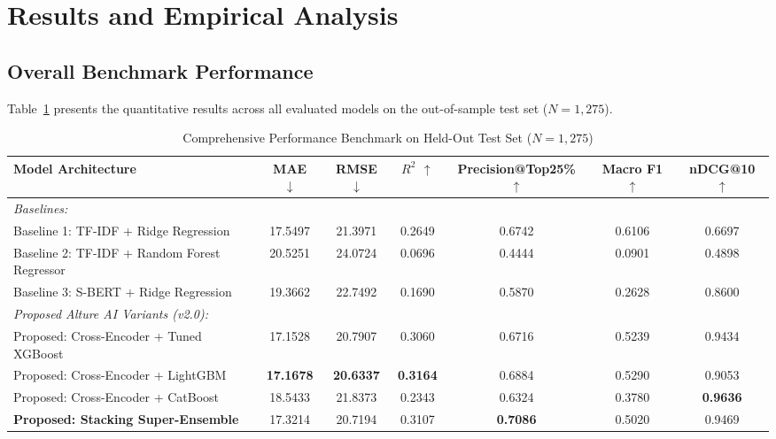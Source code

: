 \documentclass[conference]{IEEEtran}
\begin{document}
\section{Results and Empirical Analysis}

\subsection{Overall Benchmark Performance}
Table~\ref{tab:main_results} presents the quantitative results across all evaluated models on the out-of-sample test set ($N=1,275$).

\begin{table}[htbp]
\centering
\caption{Comprehensive Performance Benchmark on Held-Out Test Set ($N = 1,275$)}
\label{tab:main_results}
\begin{tabular}{lcccccc}
\toprule
\textbf{Model Architecture} & \textbf{MAE} $\downarrow$ & \textbf{RMSE} $\downarrow$ & \textbf{$R^2$} $\uparrow$ & \textbf{Precision@Top25\%} $\uparrow$ & \textbf{Macro F1} $\uparrow$ & \textbf{nDCG@10} $\uparrow$ \\
\midrule
\textit{Baselines:} & & & & & & \\
Baseline 1: TF-IDF + Ridge Regression          & 17.5497 & 21.3971 & 0.2649 & 0.6742 & 0.6106 & 0.6697 \\
Baseline 2: TF-IDF + Random Forest Regressor   & 20.5251 & 24.0724 & 0.0696 & 0.4444 & 0.0901 & 0.4898 \\
Baseline 3: S-BERT + Ridge Regression          & 19.3662 & 22.7492 & 0.1690 & 0.5870 & 0.2628 & 0.8600 \\
\midrule
\textit{Proposed Alture AI Variants (v2.0):} & & & & & & \\
Proposed: Cross-Encoder + Tuned XGBoost        & 17.1528 & 20.7907 & 0.3060 & 0.6716 & 0.5239 & 0.9434 \\
Proposed: Cross-Encoder + LightGBM             & \textbf{17.1678} & \textbf{20.6337} & \textbf{0.3164} & 0.6884 & 0.5290 & 0.9053 \\
Proposed: Cross-Encoder + CatBoost             & 18.5433 & 21.8373 & 0.2343 & 0.6324 & 0.3780 & \textbf{0.9636} \\
\textbf{Proposed: Stacking Super-Ensemble}     & 17.3214 & 20.7194 & 0.3107 & \textbf{0.7086} & 0.5020 & 0.9469 \\
\bottomrule
\end{tabular}
\end{table}
\end{document}
